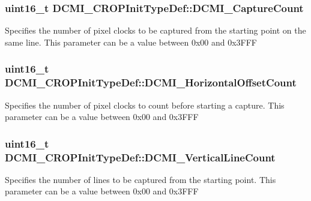 \subsubsection[{D\+C\+M\+I\+\_\+\+Capture\+Count}]{\setlength{\rightskip}{0pt plus 5cm}uint16\+\_\+t D\+C\+M\+I\+\_\+\+C\+R\+O\+P\+Init\+Type\+Def\+::\+D\+C\+M\+I\+\_\+\+Capture\+Count}\label{struct_d_c_m_i___c_r_o_p_init_type_def_af379a3ff9fddb38be10b5f50946b55d9}
Specifies the number of pixel clocks to be captured from the starting point on the same line. This parameter can be a value between 0x00 and 0x3\+F\+F\+F \hypertarget{struct_d_c_m_i___c_r_o_p_init_type_def_a33a42e98f575145749f0003fdc99f947}{}
\subsubsection[{D\+C\+M\+I\+\_\+\+Horizontal\+Offset\+Count}]{\setlength{\rightskip}{0pt plus 5cm}uint16\+\_\+t D\+C\+M\+I\+\_\+\+C\+R\+O\+P\+Init\+Type\+Def\+::\+D\+C\+M\+I\+\_\+\+Horizontal\+Offset\+Count}\label{struct_d_c_m_i___c_r_o_p_init_type_def_a33a42e98f575145749f0003fdc99f947}
Specifies the number of pixel clocks to count before starting a capture. This parameter can be a value between 0x00 and 0x3\+F\+F\+F \hypertarget{struct_d_c_m_i___c_r_o_p_init_type_def_aa12d393dbf969b568b4ec2a643456f20}{}
\subsubsection[{D\+C\+M\+I\+\_\+\+Vertical\+Line\+Count}]{\setlength{\rightskip}{0pt plus 5cm}uint16\+\_\+t D\+C\+M\+I\+\_\+\+C\+R\+O\+P\+Init\+Type\+Def\+::\+D\+C\+M\+I\+\_\+\+Vertical\+Line\+Count}\label{struct_d_c_m_i___c_r_o_p_init_type_def_aa12d393dbf969b568b4ec2a643456f20}
Specifies the number of lines to be captured from the starting point. This parameter can be a value between 0x00 and 0x3\+F\+F\+F \hypertarget{struct_d_c_m_i___c_r_o_p_init_type_def_a4d4f4ef4975179f025d3cde589e380fe}{}
